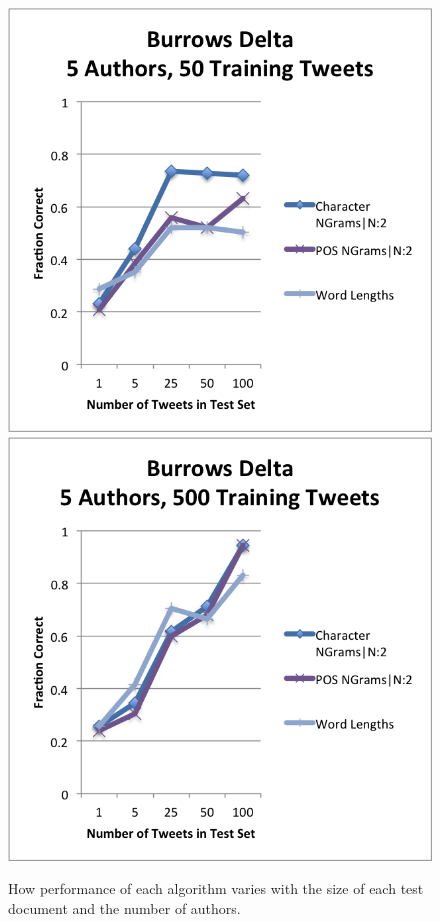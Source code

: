 \documentclass[pageno]{jpaper}
\begin{document}
\begin{figure}[h!]
\begin{center}
\includegraphics*[scale=.75]{B2}
\includegraphics*[scale=.75]{B4}
\end{center}
\caption{How performance of each algorithm varies with the size of each test document and the number of authors.}
\label{fig:VaryingTestBurrows}
\end{figure}
\end{document}
